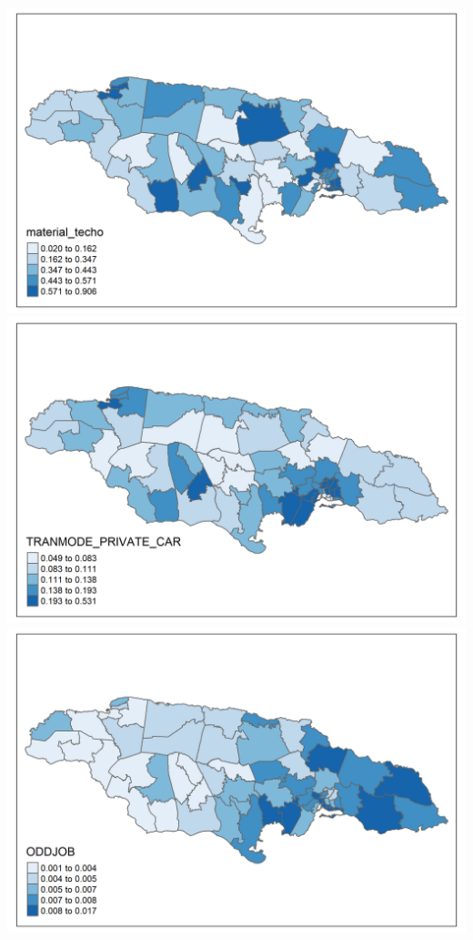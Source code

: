 \documentclass[
  12pt,
]{book}
\begin{document}
\includegraphics[width=4\linewidth]{Recursos/01_Session1/18_plot_Censo/material_techo}
\includegraphics[width=4\linewidth]{Recursos/01_Session1/18_plot_Censo/TRANMODE_PRIVATE_CAR}
\includegraphics[width=4\linewidth]{Recursos/01_Session1/18_plot_Censo/ODDJOB}
\end{document}
